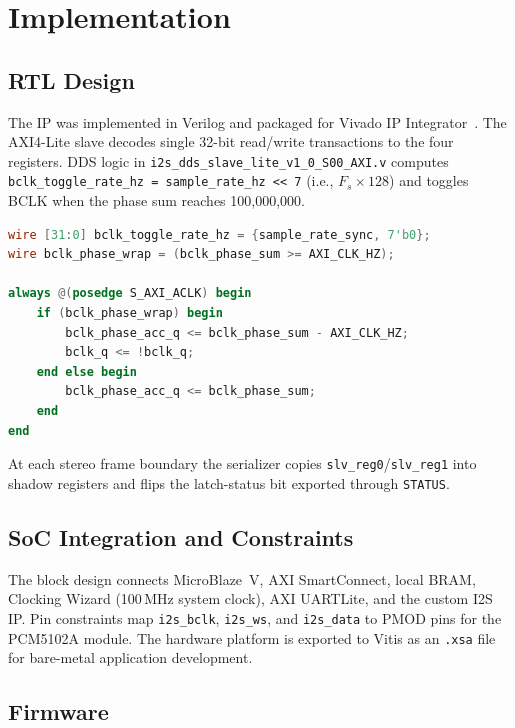\section{Implementation}
\label{sec:implementation}

\subsection{RTL Design}

The IP was implemented in Verilog and packaged for Vivado IP Integrator~\cite{xilinx_vivado_design_suite_2021}.
The AXI4-Lite slave decodes single 32-bit read/write transactions to the four registers.
DDS logic in \texttt{i2s\_dds\_slave\_lite\_v1\_0\_S00\_AXI.v} computes \texttt{bclk\_toggle\_rate\_hz = sample\_rate\_hz << 7} (i.e., $F_s \times 128$) and toggles BCLK when the phase sum reaches 100{,}000{,}000.

\begin{lstlisting}[language=Verilog, caption={DDS phase accumulator for BCLK generation.}, label={lst:dds}]
wire [31:0] bclk_toggle_rate_hz = {sample_rate_sync, 7'b0};
wire bclk_phase_wrap = (bclk_phase_sum >= AXI_CLK_HZ);

always @(posedge S_AXI_ACLK) begin
    if (bclk_phase_wrap) begin
        bclk_phase_acc_q <= bclk_phase_sum - AXI_CLK_HZ;
        bclk_q <= !bclk_q;
    end else begin
        bclk_phase_acc_q <= bclk_phase_sum;
    end
end
\end{lstlisting}

At each stereo frame boundary the serializer copies \texttt{slv\_reg0}/\texttt{slv\_reg1} into shadow registers and flips the latch-status bit exported through \texttt{STATUS}.

\subsection{SoC Integration and Constraints}

The block design connects MicroBlaze~V, AXI SmartConnect, local BRAM, Clocking Wizard (100\,MHz system clock), AXI UARTLite, and the custom I2S IP.
Pin constraints map \texttt{i2s\_bclk}, \texttt{i2s\_ws}, and \texttt{i2s\_data} to PMOD pins for the PCM5102A module.
The hardware platform is exported to Vitis as an \texttt{.xsa} file for bare-metal application development.

\subsection{Firmware}

